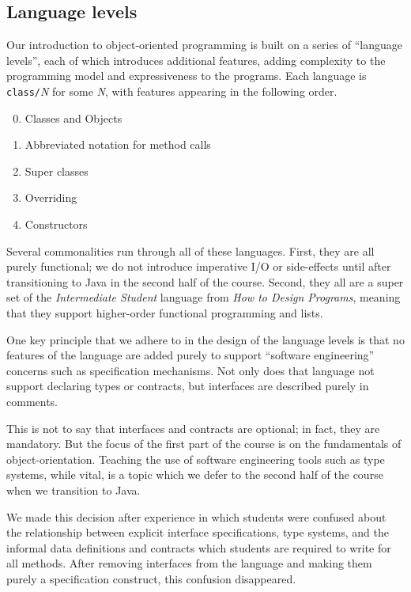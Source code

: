\documentclass[submission,copyright]{eptcs}
\def\htdp{\emph{How to Design Programs}\xspace}
\begin{document}
\subsection{Language levels}

Our introduction to object-oriented programming is built on a series
of ``language levels'', each of which introduces additional features,
adding complexity to the programming model and expressiveness to the
programs.  Each language is  \texttt{class/}\textit{N}
for some \textit{N}, with features appearing in the following order.
\begin{enumerate}
  \setcounter{enumi}{-1}
\item Classes and Objects
\item Abbreviated notation for method calls
\item Super classes
\item Overriding
\item Constructors
\end{enumerate}

Several commonalities run through all of these languages.  First, they
are all purely functional; we do not introduce imperative I/O or
side-effects until after transitioning to Java in the second half of
the course.  Second, they all are a super set of the
\emph{Intermediate Student} language from \htdp, meaning that they
support higher-order functional programming and lists. 

One key principle that we adhere to in the design of the language
levels is that no features of the language are added purely to support
``software engineering'' concerns such as specification mechanisms.
Not only does that language not support declaring types or contracts,
but interfaces are described purely in comments.

This is not to say that interfaces and contracts are optional; in
fact, they are mandatory.  But the focus of the first part of the
course is on the fundamentals of object-orientation.  Teaching the use
of software engineering tools such as type systems, while vital, is a
topic which we defer to the second half of the course when we
transition to Java. 

We made this decision after experience in which students were confused
about the relationship between explicit interface specifications, type
systems, and the informal data definitions and contracts which
students are required to write for all methods.  After removing
interfaces from the language and making them purely a specification
construct, this confusion disappeared.
\end{document}
